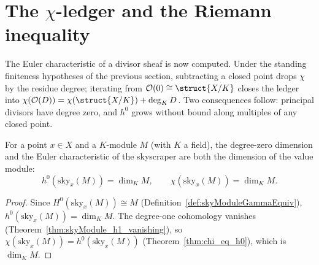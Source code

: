 \section{The \texorpdfstring{\(\chi\)}{chi}-ledger and the Riemann inequality}

The Euler characteristic of a divisor sheaf is now computed. Under the standing finiteness
hypotheses of the previous section, subtracting a closed point drops \(\chi\) by the residue
degree; iterating from \(\mathcal O(0) \cong \struct{X/K}\) closes the ledger into
\(\chi(\mathcal O(D)) = \chi(\struct{X/K}) + \deg_K D\). Two consequences follow: principal
divisors have degree zero, and \(h^0\) grows without bound along multiples of any closed point.

\begin{theorem}
  \label{thm:chi_skyModule}
  \leanok
  For a point \(x \in X\) and a \(K\)-module \(M\) (with \(K\) a field), the degree-zero
  dimension and the Euler characteristic of the skyscraper are both the dimension of the value
  module:
  \[
    h^0(\mathrm{sky}_x(M)) = \dim_K M, \qquad \chi(\mathrm{sky}_x(M)) = \dim_K M .
  \]
\end{theorem}
\begin{proof}
  \leanok
  Since \(H^0(\mathrm{sky}_x(M)) \cong M\) (Definition~\ref{def:skyModuleGammaEquiv}),
  \(h^0(\mathrm{sky}_x(M)) = \dim_K M\). The degree-one cohomology vanishes
  (Theorem~\ref{thm:skyModule_h1_vanishing}), so
  \(\chi(\mathrm{sky}_x(M)) = h^0(\mathrm{sky}_x(M))\) (Theorem~\ref{thm:chi_eq_h0}), which is
  \(\dim_K M\).
\end{proof}

